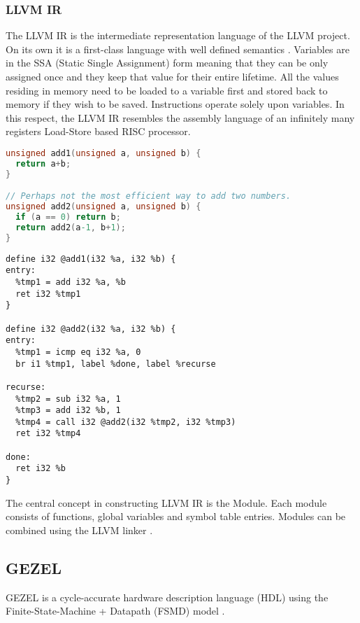 \subsubsection{LLVM IR}

The LLVM IR is the intermediate representation language of the LLVM
project. On its own it is a first-class language with well defined
semantics \cite{llvm_general, llvm_master_thesis}. Variables are in the SSA (Static Single
Assignment) form meaning that they can be only assigned once and they
keep that value for their entire lifetime. All the values residing in
memory need to be loaded to a variable first and stored back to memory
if they wish to be saved. Instructions operate solely upon
variables. In this respect, the LLVM IR resembles the assembly
language of an infinitely many registers Load-Store based RISC
processor.

\begin{lstlisting}[language=C]
unsigned add1(unsigned a, unsigned b) {
  return a+b;
}

// Perhaps not the most efficient way to add two numbers.
unsigned add2(unsigned a, unsigned b) {
  if (a == 0) return b;
  return add2(a-1, b+1);
}
\end{lstlisting}

\begin{lstlisting}
define i32 @add1(i32 %a, i32 %b) {
entry:
  %tmp1 = add i32 %a, %b
  ret i32 %tmp1
}

define i32 @add2(i32 %a, i32 %b) {
entry:
  %tmp1 = icmp eq i32 %a, 0
  br i1 %tmp1, label %done, label %recurse

recurse:
  %tmp2 = sub i32 %a, 1
  %tmp3 = add i32 %b, 1
  %tmp4 = call i32 @add2(i32 %tmp2, i32 %tmp3)
  ret i32 %tmp4

done:
  ret i32 %b
}
\end{lstlisting}

The central concept in constructing LLVM IR is the Module. Each module
consists of functions, global variables and symbol table entries.
Modules can be combined using the LLVM linker \cite{llvm_ir}.

\subsection{GEZEL}

GEZEL is a cycle-accurate hardware description language (HDL) using the
Finite-State-Machine + Datapath (FSMD) model \cite{gezel}.

